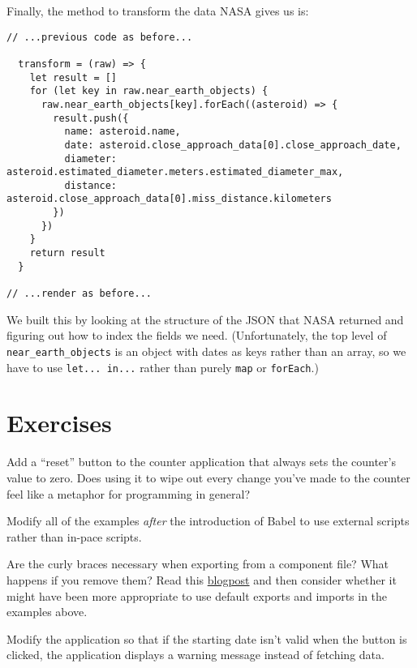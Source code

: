 Finally,
the method to transform the data NASA gives us is:

\begin{verbatim}
// ...previous code as before...

  transform = (raw) => {
    let result = []
    for (let key in raw.near_earth_objects) {
      raw.near_earth_objects[key].forEach((asteroid) => {
        result.push({
          name: asteroid.name,
          date: asteroid.close_approach_data[0].close_approach_date,
          diameter: asteroid.estimated_diameter.meters.estimated_diameter_max,
          distance: asteroid.close_approach_data[0].miss_distance.kilometers
        })
      })
    }
    return result
  }

// ...render as before...
\end{verbatim}

We built this by looking at the structure of the JSON that NASA returned
and figuring out how to index the fields we need.
(Unfortunately,
the top level of \texttt{near\_earth\_objects} is an object with dates as keys rather than an array,
so we have to use \texttt{let...\ in...} rather than purely \texttt{map} or \texttt{forEach}.)

\section{Exercises}\label{s:interactive-exercises}


Add a ``reset'' button to the counter application that always sets the counter's value to zero.
Does using it to wipe out every change you've made to the counter
feel like a metaphor for programming in general?


Modify all of the examples \emph{after} the introduction of Babel
to use external scripts rather than in-pace scripts.


Are the curly braces necessary when exporting from a component file?
What happens if you remove them?
Read this \href{http://2ality.com/2014/09/es6-modules-final.html}{blogpost} and then consider whether it might
have been more appropriate to use default exports and imports
in the examples above.


Modify the application so that if the starting date isn't valid when the button is clicked,
the application displays a warning message instead of fetching data.

